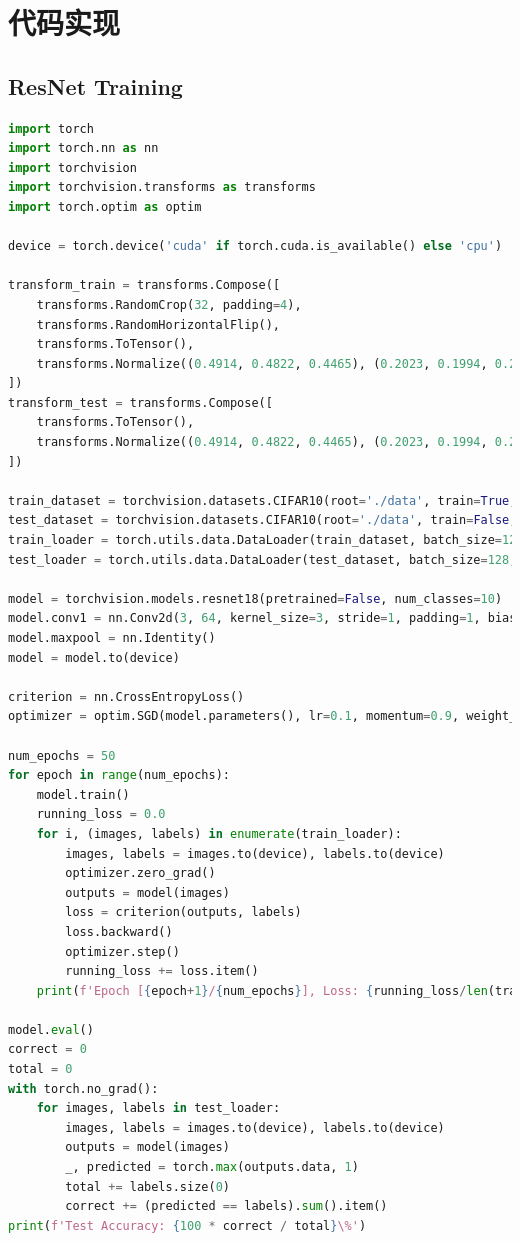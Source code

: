 \documentclass[UTF8]{report}
\theoremstyle{MyLineTheoremStyle} %
\theoremstyle{MyBlockTheoremStyle} %
\theoremstyle{MySubsubsectionStyle} %
\begin{document}
\section*{代码实现}
\subsection*{ResNet Training}
\begin{lstlisting}[language=Python]
import torch
import torch.nn as nn
import torchvision
import torchvision.transforms as transforms
import torch.optim as optim

device = torch.device('cuda' if torch.cuda.is_available() else 'cpu')

transform_train = transforms.Compose([
    transforms.RandomCrop(32, padding=4),
    transforms.RandomHorizontalFlip(),
    transforms.ToTensor(),
    transforms.Normalize((0.4914, 0.4822, 0.4465), (0.2023, 0.1994, 0.2010))
])
transform_test = transforms.Compose([
    transforms.ToTensor(),
    transforms.Normalize((0.4914, 0.4822, 0.4465), (0.2023, 0.1994, 0.2010))
])

train_dataset = torchvision.datasets.CIFAR10(root='./data', train=True, download=True, transform=transform_train)
test_dataset = torchvision.datasets.CIFAR10(root='./data', train=False, download=True, transform=transform_test)
train_loader = torch.utils.data.DataLoader(train_dataset, batch_size=128, shuffle=True)
test_loader = torch.utils.data.DataLoader(test_dataset, batch_size=128, shuffle=False)

model = torchvision.models.resnet18(pretrained=False, num_classes=10)
model.conv1 = nn.Conv2d(3, 64, kernel_size=3, stride=1, padding=1, bias=False)
model.maxpool = nn.Identity()
model = model.to(device)

criterion = nn.CrossEntropyLoss()
optimizer = optim.SGD(model.parameters(), lr=0.1, momentum=0.9, weight_decay=1e-4)

num_epochs = 50
for epoch in range(num_epochs):
    model.train()
    running_loss = 0.0
    for i, (images, labels) in enumerate(train_loader):
        images, labels = images.to(device), labels.to(device)
        optimizer.zero_grad()
        outputs = model(images)
        loss = criterion(outputs, labels)
        loss.backward()
        optimizer.step()
        running_loss += loss.item()
    print(f'Epoch [{epoch+1}/{num_epochs}], Loss: {running_loss/len(train_loader):.4f}')

model.eval()
correct = 0
total = 0
with torch.no_grad():
    for images, labels in test_loader:
        images, labels = images.to(device), labels.to(device)
        outputs = model(images)
        _, predicted = torch.max(outputs.data, 1)
        total += labels.size(0)
        correct += (predicted == labels).sum().item()
print(f'Test Accuracy: {100 * correct / total}\%')
\end{lstlisting}
\end{document}
